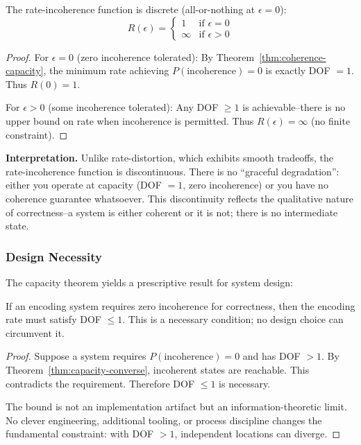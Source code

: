 \begin{theorem}\label{thm:rate-incoherence-step}
The rate-incoherence function is discrete (all-or-nothing at $\epsilon=0$):
\[
R(\epsilon) = \begin{cases}
1 & \text{if } \epsilon = 0 \\
\infty & \text{if } \epsilon > 0
\end{cases}
\]
\end{theorem}

\begin{proof}
For $\epsilon = 0$ (zero incoherence tolerated): By Theorem~\ref{thm:coherence-capacity}, the minimum rate achieving $P(\text{incoherence}) = 0$ is exactly DOF $= 1$. Thus $R(0) = 1$.

For $\epsilon > 0$ (some incoherence tolerated): Any DOF $\geq 1$ is achievable--there is no upper bound on rate when incoherence is permitted. Thus $R(\epsilon) = \infty$ (no finite constraint).
\end{proof}

\textbf{Interpretation.} Unlike rate-distortion, which exhibits smooth tradeoffs, the rate-incoherence function is discontinuous. There is no ``graceful degradation'': either you operate at capacity (DOF $= 1$, zero incoherence) or you have no coherence guarantee whatsoever. This discontinuity reflects the qualitative nature of correctness--a system is either coherent or it is not; there is no intermediate state.

\subsubsection{Design Necessity}

The capacity theorem yields a prescriptive result for system design:

\begin{theorem}\label{thm:design-necessity}
If an encoding system requires zero incoherence for correctness, then the encoding rate must satisfy DOF $\leq 1$. This is a necessary condition; no design choice can circumvent it.
\end{theorem}

\begin{proof}
Suppose a system requires $P(\text{incoherence}) = 0$ and has DOF $> 1$. By Theorem~\ref{thm:capacity-converse}, incoherent states are reachable. This contradicts the requirement. Therefore DOF $\leq 1$ is necessary.

The bound is not an implementation artifact but an information-theoretic limit. No clever engineering, additional tooling, or process discipline changes the fundamental constraint: with DOF $> 1$, independent locations can diverge.
\end{proof}

